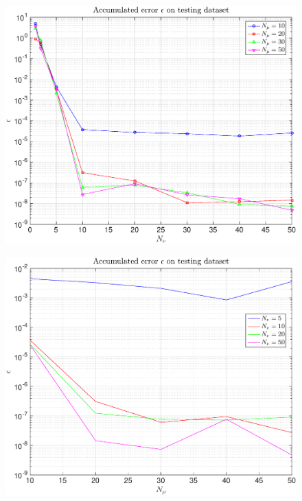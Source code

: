 \documentclass[11pt,a4paper]{article}
\theoremstyle{definition}
\theoremstyle{theorem}
\begin{document}
	\begin{figure}
		\center
		\includegraphics[scale=0.5]{fig25}
		\caption{}
	\end{figure}
	
	\begin{figure}
		\center
		\includegraphics[scale=0.5]{fig26}
		\caption{}
	\end{figure}
	
\end{document}
